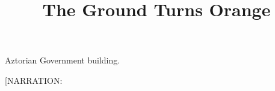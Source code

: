 \documentclass[11pt]{article}
\begin{document}
\ttfamily
\title{The Ground Turns Orange}
\maketitle

Aztorian Government building.

[NARRATION: 
\end{document}
